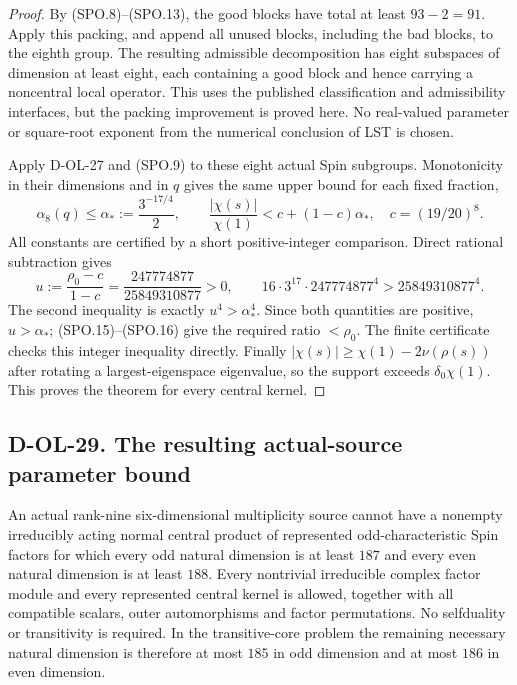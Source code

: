 \begin{proof}
By (SPO.8)--(SPO.13), the good blocks have total at least
$93-2=91$.  Apply this packing, and append all unused blocks,
including the bad blocks, to the eighth group.  The resulting
admissible decomposition has eight subspaces of dimension at
least eight, each containing a good block and hence carrying a
noncentral local operator.  This uses the published classification
and admissibility interfaces, but the packing improvement is
proved here.  No real-valued parameter or square-root exponent
from the numerical conclusion of LST is chosen.

Apply D-OL-27 and (SPO.9) to these eight actual Spin
subgroups.  Monotonicity in their dimensions and in $q$
gives the same upper bound for each fixed fraction,
\[
 \alpha_8(q)\le\alpha_*:=\frac{3^{-17/4}}2,
 \qquad
 \frac{|\chi(s)|}{\chi(1)}
       <c+(1-c)\alpha_*,\quad c=(19/20)^8.
 \tag{SPO.15}
\]
All constants are certified by a short positive-integer
comparison.  Direct rational subtraction gives
\[
 u:=\frac{\rho_0-c}{1-c}
       =\frac{247774877}{25849310877}>0,
 \qquad
 16\cdot3^{17}\cdot247774877^4>25849310877^4.
 \tag{SPO.16}
\]
The second inequality is exactly $u^4>\alpha_*^4$.
Since both quantities are positive, $u>\alpha_*$;
(SPO.15)--(SPO.16) give the required ratio $<\rho_0$.
The finite certificate checks this integer inequality
directly.  Finally $|\chi(s)|\ge\chi(1)-2\nu(\rho(s))$
after rotating a largest-eigenspace eigenvalue, so the
support exceeds $\delta_0\chi(1)$.
This proves the theorem for every central kernel.
\end{proof}

\subsection*{D-OL-29. The resulting actual-source parameter bound}

\begin{theorem}[D-OL-29]
An actual rank-nine six-dimensional multiplicity source cannot
have a nonempty irreducibly acting normal central product of
represented odd-characteristic Spin factors for which every
odd natural dimension is at least $187$ and every even natural
dimension is at least $188$.
Every nontrivial irreducible complex factor module and every
represented central kernel is allowed, together with all
compatible scalars, outer automorphisms and factor permutations.
No selfduality or transitivity is required.
In the transitive-core problem the remaining necessary natural
dimension is therefore at most $185$ in odd dimension and
at most $186$ in even dimension.
\end{theorem}

